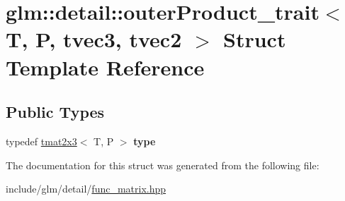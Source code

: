 \hypertarget{structglm_1_1detail_1_1outerProduct__trait_3_01T_00_01P_00_01tvec3_00_01tvec2_01_4}{}\section{glm\+:\+:detail\+:\+:outer\+Product\+\_\+trait$<$ T, P, tvec3, tvec2 $>$ Struct Template Reference}
\label{structglm_1_1detail_1_1outerProduct__trait_3_01T_00_01P_00_01tvec3_00_01tvec2_01_4}
\subsection*{Public Types}
\begin{DoxyCompactItemize}
\item 
\mbox{\label{structglm_1_1detail_1_1outerProduct__trait_3_01T_00_01P_00_01tvec3_00_01tvec2_01_4_a32c937f071826a01c5e1d80ef32f8740}} 
typedef \hyperlink{structglm_1_1tmat2x3}{tmat2x3}$<$ T, P $>$ {\bfseries type}
\end{DoxyCompactItemize}


The documentation for this struct was generated from the following file\+:\begin{DoxyCompactItemize}
\item 
include/glm/detail/\hyperlink{func__matrix_8hpp}{func\+\_\+matrix.\+hpp}\end{DoxyCompactItemize}
